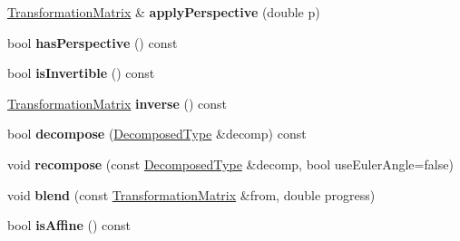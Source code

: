 \begin{DoxyCompactItemize}
\item 
\mbox{\label{class_web_core_1_1_transformation_matrix_a5f0fce557817a95c106386d50f15b562}} 
\mbox{\hyperlink{class_web_core_1_1_transformation_matrix}{Transformation\+Matrix}} \& {\bfseries apply\+Perspective} (double p)
\item 
\mbox{\label{class_web_core_1_1_transformation_matrix_abc4a77370ac7456e97fce6a9d1d7f472}} 
bool {\bfseries has\+Perspective} () const
\item 
\mbox{\label{class_web_core_1_1_transformation_matrix_a86fc5891cad0b3492e90ef4e8e0391a5}} 
bool {\bfseries is\+Invertible} () const
\item 
\mbox{\label{class_web_core_1_1_transformation_matrix_a2dcabaa25983ac9eb972cdef6d7cd4cf}} 
\mbox{\hyperlink{class_web_core_1_1_transformation_matrix}{Transformation\+Matrix}} {\bfseries inverse} () const
\item 
\mbox{\label{class_web_core_1_1_transformation_matrix_a3ac23efda2366e7f160fb8c0e0b39bf2}} 
bool {\bfseries decompose} (\mbox{\hyperlink{struct_web_core_1_1_transformation_matrix_1_1_decomposed_type}{Decomposed\+Type}} \&decomp) const
\item 
\mbox{\label{class_web_core_1_1_transformation_matrix_a930065af80a1154a5396f11a436ccb64}} 
void {\bfseries recompose} (const \mbox{\hyperlink{struct_web_core_1_1_transformation_matrix_1_1_decomposed_type}{Decomposed\+Type}} \&decomp, bool use\+Euler\+Angle=false)
\item 
\mbox{\label{class_web_core_1_1_transformation_matrix_a89e8cbe67be97912a7bfe6fe8fd33950}} 
void {\bfseries blend} (const \mbox{\hyperlink{class_web_core_1_1_transformation_matrix}{Transformation\+Matrix}} \&from, double progress)
\item 
\mbox{\label{class_web_core_1_1_transformation_matrix_ac8be699ca618796d0c6aa399fd81d049}} 
bool {\bfseries is\+Affine} () const

\end{DoxyCompactItemize}
